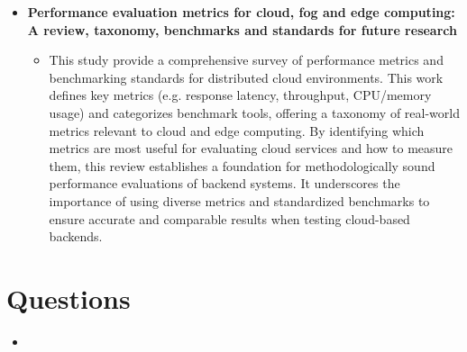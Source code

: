 \documentclass[11pt]{article}
\begin{document}
\begin{itemize}
    \item[] \textbf{Performance evaluation metrics for cloud, fog and edge computing: A review, taxonomy, benchmarks and standards for future research}
    \begin{itemize}
        \item[] This study provide a comprehensive survey of performance metrics and benchmarking standards for distributed cloud environments. This work defines key metrics (e.g. response latency, throughput, CPU/memory usage) and categorizes benchmark tools, offering a taxonomy of real-world metrics relevant to cloud and edge computing. By identifying which metrics are most useful for evaluating cloud services and how to measure them, this review establishes a foundation for methodologically sound performance evaluations of backend systems. It underscores the importance of using diverse metrics and standardized benchmarks to ensure accurate and comparable results when testing cloud-based backends.
    \end{itemize}
\end{itemize}




\section*{Questions}
\begin{itemize}
  \item[]
\end{itemize}
\end{document}
